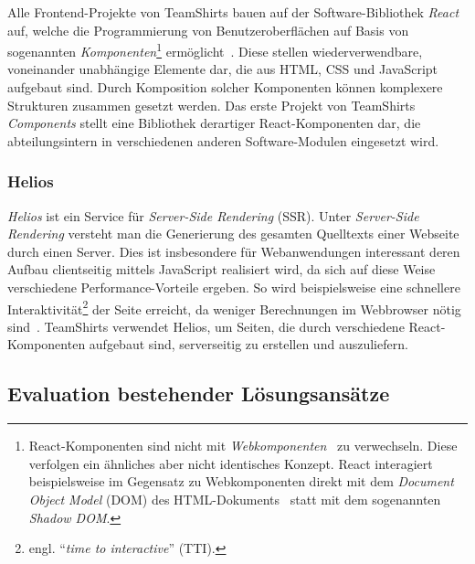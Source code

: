 Alle Frontend-Projekte von TeamShirts bauen auf der Software-Bibliothek \textit{React}~\autocite{SOFTWARE:REACT} auf, welche die Programmierung von Benutzeroberflächen auf Basis von sogenannten \emph{Komponenten}\footnote{React-Komponenten sind nicht mit \textit{Webkomponenten}~\autocite{MDN:WEBCOMPONENTS} zu verwechseln. Diese verfolgen ein ähnliches aber nicht identisches Konzept. React interagiert beispielsweise im Gegensatz zu Webkomponenten direkt mit dem \textit{Document Object Model} (DOM) des HTML-Dokuments~\autocite{REACT:WEBCOMPONENTS} statt mit dem sogenannten \textit{Shadow DOM}.} ermöglicht~\autocite{ACM:REACT}. Diese stellen wiederverwendbare, voneinander unabhängige Elemente dar, die aus HTML, CSS und JavaScript aufgebaut sind. Durch Komposition solcher Komponenten können komplexere Strukturen zusammen gesetzt werden. Das erste Projekt von TeamShirts \textit{Components} stellt eine Bibliothek derartiger React-Komponenten dar, die abteilungsintern in verschiedenen anderen Software-Modulen eingesetzt wird.

\subsubsection{Helios}

\textit{Helios} ist ein Service für \emph{Server-Side Rendering} (SSR). Unter \emph{Server-Side Rendering} versteht man die Generierung des gesamten Quelltexts einer Webseite durch einen Server. Dies ist insbesondere für Webanwendungen interessant deren Aufbau clientseitig mittels JavaScript realisiert wird, da sich auf diese Weise verschiedene Performance-Vorteile ergeben. So wird beispielsweise eine schnellere Interaktivität\footnote{engl. \enquote{\textit{time to interactive}} (TTI).} der Seite erreicht, da weniger Berechnungen im Webbrowser nötig sind~\autocite{GOOGLE:RENDERING_ON_THE_WEB}. TeamShirts verwendet Helios, um Seiten, die durch verschiedene React-Komponenten aufgebaut sind, serverseitig zu erstellen und auszuliefern.

\subsection{Evaluation bestehender Lösungsansätze}

